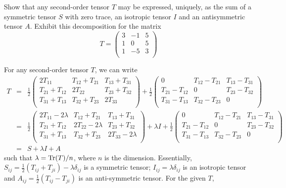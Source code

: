 \documentclass[a4paper]{article}
\begin{document}
\begin{qns}
Show that any second-order tensor $T$ may be expressed, uniquely, as the sum of a symmetric tensor $S$ with zero trace, an isotropic tensor $I$ and an antisymmetric tensor $A$. Exhibit this decomposition for the matrix
$$T=\begin{pmatrix}3&-1&5\\1&0&5\\1&-5&3\\\end{pmatrix}$$
\end{qns}
\begin{ans}
For any second-order tensor $T$, we can write
\begin{eqnarray}
T&=&\frac{1}{2}\begin{pmatrix}2T_{11}&T_{12}+T_{21}&T_{13}+T_{31}\\T_{21}+T_{12}&2T_{22}&T_{23}+T_{32}\\T_{31}+T_{13}&T_{32}+T_{23}&2T_{33}\\\end{pmatrix}+\frac{1}{2}\begin{pmatrix}0&T_{12}-T_{21}&T_{13}-T_{31}\\T_{21}-T_{12}&0&T_{23}-T_{32}\\T_{31}-T_{13}&T_{32}-T_{23}&0\\\end{pmatrix}\nonumber\\&=&\frac{1}{2}\begin{pmatrix}2T_{11}-2\lambda&T_{12}+T_{21}&T_{13}+T_{31}\\T_{21}+T_{12}&2T_{22}-2\lambda&T_{23}+T_{32}\\T_{31}+T_{13}&T_{32}+T_{23}&2T_{33}-2\lambda\\\end{pmatrix}+\lambda I+\frac{1}{2}\begin{pmatrix}0&T_{12}-T_{21}&T_{13}-T_{31}\\T_{21}-T_{12}&0&T_{23}-T_{32}\\T_{31}-T_{13}&T_{32}-T_{23}&0\\\end{pmatrix}\nonumber\\&=&S+\lambda I+A\nonumber
\end{eqnarray}
such that $\lambda=\operatorname{Tr}(T)/n$,  where $n$ is the dimension. Essentially, $S_{ij}=\frac{1}{2}(T_{ij}+T_{ji})-\lambda\delta_{ij}$ is a symmetric tensor; $I_{ij}=\lambda\delta_{ij}$ is an isotropic tensor and $A_{ij}=\frac{1}{2}(T_{ij}-T_{ji})$ is an anti-symmetric tensor. For the given $T$,

\end{ans}
\end{document}
